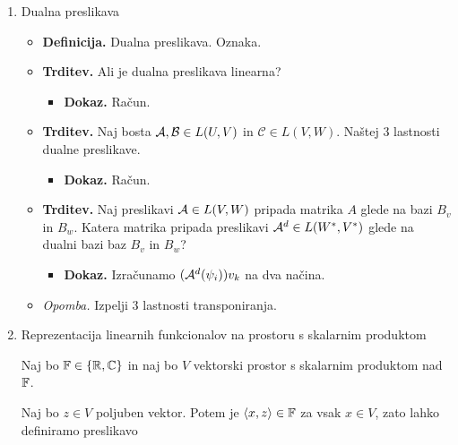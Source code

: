\begin{enumerate}
    \item Dualna preslikava
    \begin{itemize}
        \item \colorbox{purple!30}{\textbf{Definicija.}} Dualna preslikava. Oznaka.
        \item \colorbox{blue!30}{\textbf{Trditev.}} Ali je dualna preslikava linearna?
        \begin{itemize}
            \item \colorbox{green!30}{\textbf{Dokaz.}} Račun.            
        \end{itemize}
        \item \colorbox{blue!30}{\textbf{Trditev.}} Naj bosta $\mathcal{A}, \mathcal{B} \in L(U, V)$ in $\mathcal{C} \in L(V, W)$. Naštej 3 lastnosti dualne preslikave.
        \begin{itemize}
            \item \colorbox{green!30}{\textbf{Dokaz.}} Račun.            
        \end{itemize}
        \item \colorbox{blue!30}{\textbf{Trditev.}} Naj preslikavi $\mathcal{A}\in L(V, W)$ pripada matrika $A$ glede na bazi $B_v$ in $B_w$. Katera matrika pripada preslikavi $\mathcal{A}^d \in L(W^*, V^*)$ glede na dualni bazi baz $B_v$ in $B_w$?
        \begin{itemize}
            \item \colorbox{green!30}{\textbf{Dokaz.}} Izračunamo $(\mathcal{A}^d(\psi_i))v_k$ na dva načina.           
        \end{itemize}
        \item \colorbox{yellow!30}{\emph{Opomba.}} Izpelji 3 lastnosti transponiranja.
    \end{itemize}

    \item Reprezentacija linearnih funkcionalov na prostoru s skalarnim produktom
    
    Naj bo $\mathbb{F} \in \left\{\mathbb{R}, \mathbb{C}\right\}$ in naj bo $V$ vektorski prostor s skalarnim produktom nad $\mathbb{F}$. 

    Naj bo $z \in V$ poljuben vektor. Potem je $\left\langle x, z \right\rangle \in \mathbb{F}$ za vsak $x \in V$, zato lahko definiramo preslikavo 
    

\end{enumerate}
